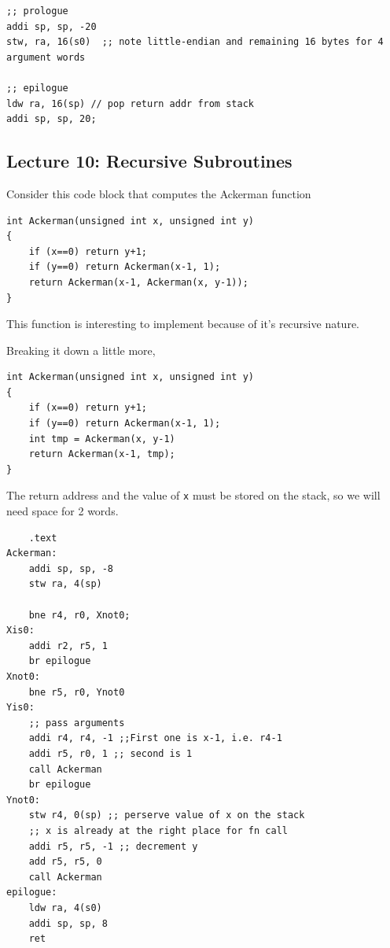 \documentclass[../notes.tex]{subfiles}
\begin{document}
\begin{listing}[H]
\begin{verbatim}
;; prologue
addi sp, sp, -20
stw, ra, 16(s0)  ;; note little-endian and remaining 16 bytes for 4 argument words

;; epilogue
ldw ra, 16(sp) // pop return addr from stack
addi sp, sp, 20;
\end{verbatim}
\end{listing}












\subsection{Lecture 10: Recursive Subroutines}

Consider this code block that computes the Ackerman function


\begin{listing}[H]
\begin{verbatim}
int Ackerman(unsigned int x, unsigned int y)
{
	if (x==0) return y+1;
	if (y==0) return Ackerman(x-1, 1);
	return Ackerman(x-1, Ackerman(x, y-1));
}
\end{verbatim}
\end{listing}

This function is interesting to implement because of it's recursive nature.


Breaking it down a little more,
\begin{listing}[H]
\begin{verbatim}
int Ackerman(unsigned int x, unsigned int y)
{
	if (x==0) return y+1;
	if (y==0) return Ackerman(x-1, 1);
	int tmp = Ackerman(x, y-1)
	return Ackerman(x-1, tmp);
}
\end{verbatim}
\end{listing}


The return address and the value of \texttt{x} must be stored on the stack, so we will need space for 2 words.


\begin{listing}[H]
\begin{verbatim}
	.text
Ackerman:
	addi sp, sp, -8
	stw ra, 4(sp)

	bne r4, r0, Xnot0;
Xis0:
	addi r2, r5, 1
	br epilogue
Xnot0:
	bne r5, r0, Ynot0
Yis0:
	;; pass arguments
	addi r4, r4, -1 ;;First one is x-1, i.e. r4-1
	addi r5, r0, 1 ;; second is 1
	call Ackerman
	br epilogue
Ynot0:
	stw r4, 0(sp) ;; perserve value of x on the stack
	;; x is already at the right place for fn call
	addi r5, r5, -1 ;; decrement y
	add r5, r5, 0
	call Ackerman
epilogue:
	ldw ra, 4(s0)
	addi sp, sp, 8
	ret
\end{verbatim}
\end{listing}
\end{document}
